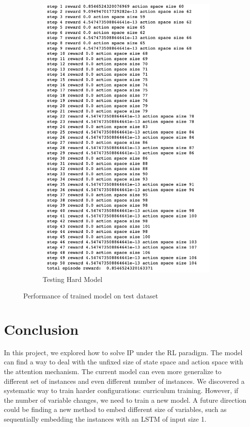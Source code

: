 \documentclass{article}
\begin{document}
\begin{figure}[H]
\begin{subfigure}[b]{0.45\textwidth}
         \centering
         \includegraphics[width=\textwidth]{hard_test.png}
         \caption{Testing Hard Model}
     \end{subfigure}     
     \caption{Performance of trained model on test dataset}
\end{figure}


\section{Conclusion}
In this project, we explored how to solve IP under the RL paradigm. The model can find a way to deal with the unfixed size of state space and action space with the attention mechanism. The current model can even more generalize to different set of instances and even different number of instances. We discovered a systematic way to train harder configurations: curriculum training. However, if the number of variable changes, we need to train a new model. A future direction could be finding a new method to embed different size of variables, such as sequentially embedding the instances with an LSTM of input size 1. 


  
  
\end{document}
